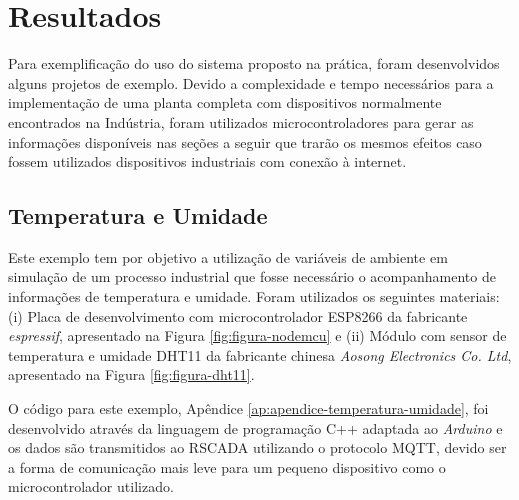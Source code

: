 \chapter{Resultados}
\label{chap:resultados}

Para exemplificação do uso do sistema proposto na prática, foram desenvolvidos alguns projetos de exemplo. Devido a complexidade e tempo necessários para a implementação de uma planta completa com dispositivos normalmente encontrados na Indústria, foram utilizados microcontroladores para gerar as informações disponíveis nas seções a seguir que trarão os mesmos efeitos caso fossem utilizados dispositivos industriais com conexão à internet.

\section{Temperatura e Umidade}
\label{sec:temperatura-umidade}

Este exemplo tem por objetivo a utilização de variáveis de ambiente em simulação de um processo industrial que fosse necessário o acompanhamento de informações de temperatura e umidade. Foram utilizados os seguintes materiais: (i) Placa de desenvolvimento com microcontrolador ESP8266 da fabricante \textit{espressif}, apresentado na Figura \ref{fig:figura-nodemcu} e (ii) Módulo com sensor de temperatura e umidade DHT11 da fabricante chinesa \textit{Aosong Electronics Co. Ltd}, apresentado na Figura \ref{fig:figura-dht11}.

O código para este exemplo, Apêndice \ref{ap:apendice-temperatura-umidade}, foi desenvolvido através da linguagem de programação C++ adaptada ao \textit{Arduino} e os dados são transmitidos ao RSCADA utilizando o protocolo \gls{MQTT}, devido ser a forma de comunicação mais leve para um pequeno dispositivo como o microcontrolador utilizado.

        \begin{figure}[!h]
    	\end{figure}
    	

